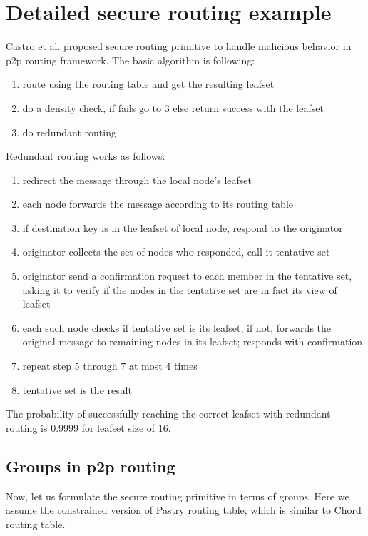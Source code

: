 \section{Detailed secure routing example}

Castro et al. proposed secure routing primitive to handle malicious behavior in p2p routing framework. The basic algorithm is following:
\begin{enumerate} 
\item{} route using the routing table and get the resulting leafset 
\item{} do a density check, if fails go to 3 else return success with the leafset 
\item{} do redundant routing 
\end{enumerate} 
 
Redundant routing works as follows: 
\begin{enumerate} 
\item{} redirect the message through the local node's leafset 
\item{} each node forwards the message according to its routing table 
\item{} if destination key is in the leafset of local node, respond to the originator 
\item{} originator collects the set of nodes who responded, call it tentative set 
\item{} originator send a confirmation request to each member in the tentative set, asking it to verify if the nodes in the tentative set are in fact its view of leafset 
\item{} each such node checks if tentative set is its leafset, if not,  forwards the original message to remaining nodes in its leafset; responds with confirmation  
\item{} repeat step 5 through 7 at most 4 times 
\item{} tentative set is the result 
\end{enumerate} 
 
The probability of successfully reaching the correct leafset with redundant routing is 0.9999 for leafset size of 16. 
 
\subsection{Groups in p2p routing} 
Now, let us formulate the secure routing primitive in terms of groups. Here we assume the constrained version of Pastry routing table, which is similar to Chord routing table. 
 
